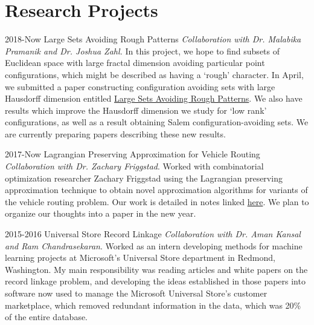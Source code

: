 \documentclass[a4paper]{cv-friggeri}
\begin{document}

\section{Research Projects}

\begin{entrylist}



\entry
{2018-Now}
{Large Sets Avoiding Rough Patterns}
{}
{\emph{Collaboration with Dr. Malabika Pramanik and Dr. Joshua Zahl.} In this project, we hope to find subsets of Euclidean space with large fractal dimension avoiding particular point configurations, which might be described as having a `rough' character. In April, we submitted a paper constructing configuration avoiding sets with large Hausdorff dimension entitled \href{https://github.com/jdjake/Notes/raw/master/Research/HausdorffDimension/FinalFractalsAvoidingFractalSetsPaper.pdf}{Large Sets Avoiding Rough Patterns}. We also have results which improve the Hausdorff dimension we study for `low rank' configurations, as well as a result obtaining Salem configuration-avoiding sets. We are currently preparing papers describing these new results.}


\entry
{2017-Now}
{Lagrangian Preserving Approximation for Vehicle Routing}
{}
{\emph{Collaboration with Dr. Zachary Friggstad}. Worked with combinatorial optimization researcher Zachary Friggstad using the Lagrangian preserving approximation technique to obtain novel approximation algorithms for variants of the vehicle routing problem. Our work is detailed in notes linked \href{https://github.com/jdjake/Notes/raw/master/Research/VehicleRouting/VehicleRouting.pdf}{here}. We plan to organize our thoughts into a paper in the new year.}


\entry
{2015-2016}
{Universal Store Record Linkage}
{}
{\emph{Collaboration with Dr. Aman Kansal and Ram Chandrasekaran}. Worked as an intern developing methods for machine learning projects at Microsoft's Universal Store department in Redmond, Washington. My main responsibility was reading articles and white papers on the record linkage problem, and developing the ideas established in those papers into software now used to manage the Microsoft Universal Store's customer marketplace, which removed redundant information in the data, which was 20\% of the entire database.}


\end{entrylist}
\end{document}
